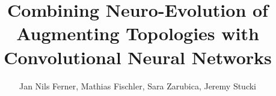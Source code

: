 \documentclass[11pt]{article}
\title{Combining Neuro-Evolution of Augmenting Topologies with Convolutional Neural Networks}
\author{Jan Nils Ferner, Mathias Fischler, Sara Zarubica, Jeremy Stucki}
\begin{document}
\maketitle
\newpage

\begin{abstract}
	
	\newpage
	
\end{abstract}

	\tableofcontents
	\newpage

	
	

	\newpage

	\nocite{*}
	{\RaggedRight
		
		
	}
\end{document}
